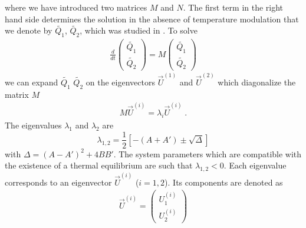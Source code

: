 \documentclass[pre,a4paper,twocolumn,superscriptaddress,%
floatfix]{revtex4}
\begin{document}
where we have introduced two matrices $M$ and $N$.
The first term in the right hand side determines the solution
in the absence of temperature modulation that we denote by $\widetilde{Q_1}$,
$\widetilde{Q_2}$, which was studied in \cite{PG}.
To solve
\begin{align}
  \label{eq:systemeqtilde}
  \frac{d}{dt}  \left( \begin{array}{c}\widetilde{Q_1} \\
                         \widetilde{Q_2} \end{array} \right)
  = M  \left( \begin{array}{c}\widetilde{Q_1} \\ \widetilde{Q_2} \end{array}
  \right)  
\end{align}
we can expand $\widetilde{Q_1}$ $\widetilde{Q_2}$ on the eigenvectors
$\vec{U}^{(1)}$ 
and $\vec{U}^{(2)}$ which diagonalize 
the matrix $M$
\begin{align}
  \label{eq:defvectpr}
  M \vec{U}^{(i)} = \lambda_i \vec{U}^{(i)} \; .
\end{align}
The eigenvalues  $\lambda_1$ and $\lambda_2$ are
\begin{equation}
  \label{eq:lambda}
  \lambda_{1,2} = \frac{1}{2} \left[ -(A + A') \pm \sqrt{\Delta} \right]
\end{equation}
with $\Delta = (A - A')^2 + 4 B B'$.
The system parameters which are compatible with the existence of a thermal
equilibrium are such that $\lambda_{1,2} < 0$. Each eigenvalue corresponds to
an eigenvector $\vec{U}^{(i)}$ ($i = 1,2$). Its components are denoted as
\begin{align}
  \label{eq:composantesvectpr}
 \vec{U}^{(i)} = \left( \begin{array}{c} U_1^{(i)} \\ U_2^{(i)} 
                      \end{array} \right)
\end{align}
\end{document}
